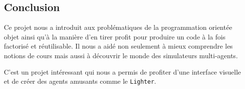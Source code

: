 \documentclass [a4paper,11pt,titlepage] {article}
\begin{document}
\begin{center}
\section* {Conclusion}
\end{center}

Ce projet nous a introduit aux problématiques de la programmation orientée objet ainsi qu'à la manière d'en tirer profit pour produire un code à la fois factorisé et réutilisable.
Il nous a aidé non seulement à mieux comprendre les notions de cours mais aussi à découvrir le monde des simulateurs multi-agents.

C'est un projet intéressant qui nous a permis de profiter d'une interface visuelle et de créer des agents amusants comme le \texttt{Lighter}.
\end{document}
